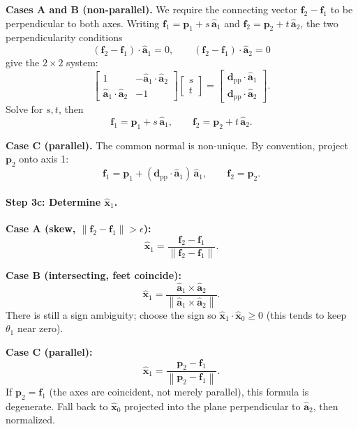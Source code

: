 \documentclass[11pt]{article}
\newcommand{\vect}[1]{\bm{#1}}
\newcommand{\unit}[1]{\hat{\bm{#1}}}
\newcommand{\norm}[1]{\left\|#1\right\|}
\begin{document}
\textbf{Cases A and B (non-parallel).} We require the connecting vector
$\vect{f}_2 - \vect{f}_1$ to be perpendicular to both axes. Writing
$\vect{f}_1 = \vect{p}_1 + s\,\unit{a}_1$ and
$\vect{f}_2 = \vect{p}_2 + t\,\unit{a}_2$, the two perpendicularity conditions
\[
  (\vect{f}_2 - \vect{f}_1) \cdot \unit{a}_1 = 0, \qquad
  (\vect{f}_2 - \vect{f}_1) \cdot \unit{a}_2 = 0
\]
give the $2 \times 2$ system:
\[
  \begin{bmatrix} 1 & -\unit{a}_1 \cdot \unit{a}_2 \\
                  \unit{a}_1 \cdot \unit{a}_2 & -1 \end{bmatrix}
  \begin{bmatrix} s \\ t \end{bmatrix}
  = \begin{bmatrix} \vect{d}_{\mathrm{pp}} \cdot \unit{a}_1 \\
                    \vect{d}_{\mathrm{pp}} \cdot \unit{a}_2 \end{bmatrix}.
\]
Solve for $s, t$, then
\[
  \vect{f}_1 = \vect{p}_1 + s\,\unit{a}_1, \qquad
  \vect{f}_2 = \vect{p}_2 + t\,\unit{a}_2.
\]

\textbf{Case C (parallel).} The common normal is non-unique. By convention,
project $\vect{p}_2$ onto axis 1:
\[
  \vect{f}_1 = \vect{p}_1 + (\vect{d}_{\mathrm{pp}} \cdot \unit{a}_1)\,\unit{a}_1,
  \qquad \vect{f}_2 = \vect{p}_2.
\]

\paragraph{Step 3c: Determine $\unit{x}_1$.}

\textbf{Case A (skew, $\norm{\vect{f}_2 - \vect{f}_1} > \epsilon$):}
\[
  \unit{x}_1 = \frac{\vect{f}_2 - \vect{f}_1}{\norm{\vect{f}_2 - \vect{f}_1}}.
\]

\textbf{Case B (intersecting, feet coincide):}
\[
  \unit{x}_1 = \frac{\unit{a}_1 \times \unit{a}_2}{\norm{\unit{a}_1 \times \unit{a}_2}}.
\]
There is still a sign ambiguity; choose the sign so
$\unit{x}_1 \cdot \unit{x}_0 \ge 0$ (this tends to keep $\theta_1$ near zero).

\textbf{Case C (parallel):}
\[
  \unit{x}_1 = \frac{\vect{p}_2 - \vect{f}_1}{\norm{\vect{p}_2 - \vect{f}_1}}.
\]
If $\vect{p}_2 = \vect{f}_1$ (the axes are coincident, not merely parallel),
this formula is degenerate. Fall back to $\unit{x}_0$ projected into the
plane perpendicular to $\unit{a}_2$, then normalized.
\end{document}
